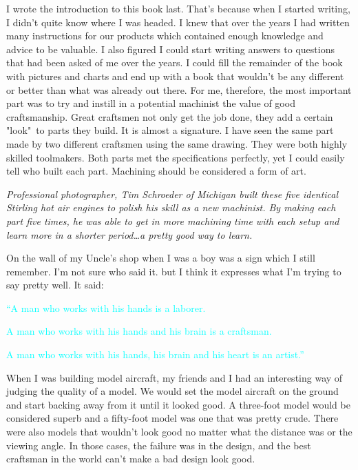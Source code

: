 \secdown{}\secdown


I wrote the introduction to this book last. That's because when I started
writing, I didn't quite know where I was headed. I knew that over the years I
had written many instructions for our products which contained enough knowledge
and advice to be valuable. I also figured I could start writing answers to
questions that had been asked of me over the years. I could fill the remainder
of the book with pictures and charts and end up with a book that wouldn't be any
different or better than what was already out there. For me, therefore, the most
important part was to try and instill in a potential machinist the value of good
craftsmanship. Great craftsmen not only get the job done, they add a certain
"look"\ to parts they build. It is almost a signature. I have seen the same part
made by two different craftsmen using the same drawing. They were both highly
skilled toolmakers. Both parts met the specifications perfectly, yet I could
easily tell who built each part. Machining should be considered a form of art.


\bigskip\textit{Professional photographer, Tim Schroeder of Michigan built
these five identical Stirling hot air engines to polish his skill as a new machinist.
By making each part five times, he was able to get in more machining time with
each setup and learn more in a shorter period\ldots a pretty good way to
learn.}\bigskip

On the wall of my Uncle's shop when I was a boy was a sign which I still
remember. I'm not sure who said it. but I think it expresses what I'm trying to
say pretty well. It said:


\bigskip
\textcolor{Cyan}{``A man who works with his hands is a laborer.}

\bigskip
\textcolor{Cyan}{A man who works with his hands and his brain is a craftsman.}

\bigskip
\textcolor{Cyan}{A man who works with his hands, his brain and his heart is an
artist.''}
\bigskip

When I was building model aircraft, my friends and I had an interesting way of
judging the quality of a model. We would set the model aircraft on the ground
and start backing away from it until it looked good. A three-foot model would be
considered superb and a fifty-foot model was one that was pretty crude. There
were also models that wouldn't look good no matter what the distance was or the
viewing angle. In those cases, the failure was in the design, and the best
craftsman in the world can't make a bad design look good.

